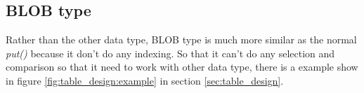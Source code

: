\subsection{BLOB type}

Rather than the other data type, BLOB type is much more similar as the normal \textit{put()} because it don't do any indexing. So that it can't do any selection and comparison so that it need to work with other data type, there is a example show in figure \ref{fig:table_design:example} in section \ref{sec:table_design}.

